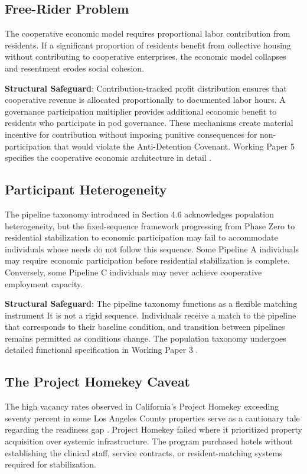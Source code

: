 \documentclass[12pt, letterpaper]{article}
\begin{document}
\subsection{Free-Rider Problem}

The cooperative economic model requires proportional labor contribution from residents. If a significant proportion of residents benefit from collective housing without contributing to cooperative enterprises, the economic model collapses and resentment erodes social cohesion.

\textbf{Structural Safeguard}: Contribution-tracked profit distribution ensures that cooperative revenue is allocated proportionally to documented labor hours. A governance participation multiplier provides additional economic benefit to residents who participate in pod governance. These mechanisms create material incentive for contribution without imposing punitive consequences for non-participation that would violate the Anti-Detention Covenant. Working Paper 5 specifies the cooperative economic architecture in detail \citep{dibella_2026_wp5}.

\subsection{Participant Heterogeneity}

The pipeline taxonomy introduced in Section 4.6 acknowledges population heterogeneity, but the fixed-sequence framework progressing from Phase Zero to residential stabilization to economic participation may fail to accommodate individuals whose needs do not follow this sequence. Some Pipeline A individuals may require economic participation before residential stabilization is complete. Conversely, some Pipeline C individuals may never achieve cooperative employment capacity.

\textbf{Structural Safeguard}: The pipeline taxonomy functions as a flexible matching instrument It is not a rigid sequence. Individuals receive a match to the pipeline that corresponds to their baseline condition, and transition between pipelines remains permitted as conditions change. The population taxonomy undergoes detailed functional specification in Working Paper 3 \citep{dibella_2026_wp3}.

\subsection{The Project Homekey Caveat}

The high vacancy rates observed in California's Project Homekey exceeding seventy percent in some Los Angeles County properties serve as a cautionary tale regarding the readiness gap \citep{pacific_research_2024}. Project Homekey failed where it prioritized property acquisition over systemic infrastructure. The program purchased hotels without establishing the clinical staff, service contracts, or resident-matching systems required for stabilization.
\end{document}
